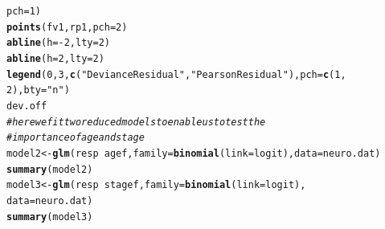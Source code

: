 \documentclass[oneside]{book}\usepackage[]{graphicx}\usepackage[svgnames]{xcolor}
\makeatletter
\newcommand{\hlnum}[1]{\textcolor[rgb]{0.686,0.059,0.569}{#1}}%
\newcommand{\hlstr}[1]{\textcolor[rgb]{0.192,0.494,0.8}{#1}}%
\newcommand{\hlcom}[1]{\textcolor[rgb]{0.678,0.584,0.686}{\textit{#1}}}%
\newcommand{\hlopt}[1]{\textcolor[rgb]{0,0,0}{#1}}%
\newcommand{\hlstd}[1]{\textcolor[rgb]{0.345,0.345,0.345}{#1}}%
\newcommand{\hlkwb}[1]{\textcolor[rgb]{0.69,0.353,0.396}{#1}}%
\newcommand{\hlkwc}[1]{\textcolor[rgb]{0.333,0.667,0.333}{#1}}%
\newcommand{\hlkwd}[1]{\textcolor[rgb]{0.737,0.353,0.396}{\textbf{#1}}}%
\newenvironment{kframe}{%
 \def\at@end@of@kframe{}%
 \ifinner\ifhmode%
  \def\at@end@of@kframe{\end{minipage}}%
  \begin{minipage}{\columnwidth}%
 \fi\fi%
 \def\FrameCommand##1{\hskip\@totalleftmargin \hskip-\fboxsep
 \colorbox{shadecolor}{##1}\hskip-\fboxsep
     \hskip-\linewidth \hskip-\@totalleftmargin \hskip\columnwidth}%
 \MakeFramed {\advance\hsize-\width
   \@totalleftmargin\z@ \linewidth\hsize
   \@setminipage}}%
 {\par\unskip\endMakeFramed%
 \at@end@of@kframe}
\newenvironment{knitrout}{}{} %
\makeatother
\begin{document}
\begin{knitrout}
\begin{kframe}
\begin{alltt}
  \hlkwc{pch} \hlstd{=} \hlnum{1}\hlstd{)}
\hlkwd{points}\hlstd{(fv1, rp1,} \hlkwc{pch} \hlstd{=} \hlnum{2}\hlstd{)}
\hlkwd{abline}\hlstd{(}\hlkwc{h} \hlstd{=} \hlopt{-}\hlnum{2}\hlstd{,} \hlkwc{lty} \hlstd{=} \hlnum{2}\hlstd{)}
\hlkwd{abline}\hlstd{(}\hlkwc{h} \hlstd{=} \hlnum{2}\hlstd{,} \hlkwc{lty} \hlstd{=} \hlnum{2}\hlstd{)}
\hlkwd{legend}\hlstd{(}\hlnum{0}\hlstd{,} \hlnum{3}\hlstd{,} \hlkwd{c}\hlstd{(}\hlstr{"Deviance Residual"}\hlstd{,} \hlstr{"Pearson Residual"}\hlstd{),} \hlkwc{pch} \hlstd{=} \hlkwd{c}\hlstd{(}\hlnum{1}\hlstd{,}
  \hlnum{2}\hlstd{),} \hlkwc{bty} \hlstd{=} \hlstr{"n"}\hlstd{)}
\hlstd{dev.off}
\hlcom{# here we fit two reduced models to enable us to test the}
\hlcom{# importance of age and stage}
\hlstd{model2} \hlkwb{<-} \hlkwd{glm}\hlstd{(resp} \hlopt{~} \hlstd{agef,} \hlkwc{family} \hlstd{=} \hlkwd{binomial}\hlstd{(}\hlkwc{link} \hlstd{= logit),} \hlkwc{data} \hlstd{= neuro.dat)}
\hlkwd{summary}\hlstd{(model2)}
\hlstd{model3} \hlkwb{<-} \hlkwd{glm}\hlstd{(resp} \hlopt{~} \hlstd{stagef,} \hlkwc{family} \hlstd{=} \hlkwd{binomial}\hlstd{(}\hlkwc{link} \hlstd{= logit),}
  \hlkwc{data} \hlstd{= neuro.dat)}
\hlkwd{summary}\hlstd{(model3)}
\end{alltt}
\end{kframe}
\end{knitrout}
\end{document}
